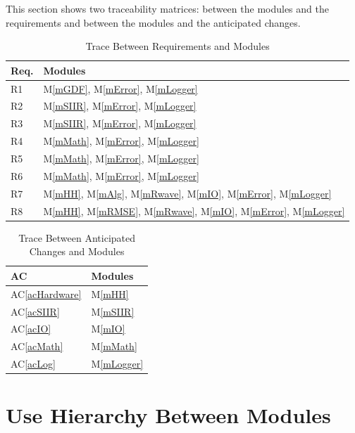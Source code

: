 \documentclass[12pt, titlepage]{article}
\newcommand{\acref}[1]{AC\ref{#1}}
\newcommand{\mref}[1]{M\ref{#1}}
\begin{document}
This section shows two traceability matrices: between the modules and the
requirements and between the modules and the anticipated changes.

\begin{table}[H]
\centering
\begin{tabular}{p{} p{}}
\toprule
\textbf{Req.} & \textbf{Modules}\\
\midrule
R1 & \mref{mGDF}, \mref{mError}, \mref{mLogger}\\
R2 & \mref{mSIIR}, \mref{mError}, \mref{mLogger}\\
R3 & \mref{mSIIR}, \mref{mError}, \mref{mLogger}\\
R4 & \mref{mMath}, \mref{mError}, \mref{mLogger}\\
R5 & \mref{mMath}, \mref{mError}, \mref{mLogger}\\
R6 & \mref{mMath}, \mref{mError}, \mref{mLogger}\\
R7 & \mref{mHH}, \mref{mAlg}, \mref{mRwave}, \mref{mIO}, \mref{mError},
\mref{mLogger}\\
R8 & \mref{mHH}, \mref{mRMSE}, \mref{mRwave}, \mref{mIO}, \mref{mError},
\mref{mLogger}\\
\bottomrule
\end{tabular}
\caption{Trace Between Requirements and Modules}
\label{TblRT}
\end{table}

\begin{table}[H]
\centering
\begin{tabular}{p{} p{}}
\toprule
\textbf{AC} & \textbf{Modules}\\
\midrule
\acref{acHardware} & \mref{mHH}\\
\acref{acSIIR} & \mref{mSIIR}\\
\acref{acIO} & \mref{mIO}\\
\acref{acMath} & \mref{mMath}\\
\acref{acLog} & \mref{mLogger}\\
\bottomrule
\end{tabular}
\caption{Trace Between Anticipated Changes and Modules}
\label{TblACT}
\end{table}

\section{Use Hierarchy Between Modules} \label{SecUse}
\end{document}

